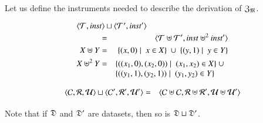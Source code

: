 \documentclass{elsarticle}
\begin{document}
   Let us define the instruments needed to describe the derivation of $\mathfrak{Z}_{\mathfrak{M}}$.
\begin{definition}
\begin{eqnarray}
   \omit\rlap{$\pair{\triples}{\inst}\sqcup\pair{\triples'}{\inst'}$}\notag\\
   &=&\pair{\triples\uplus\triples'}{\inst\uplus^2\inst'}\notag\\
      X\uplus Y&=&\{(x,0)\mid\ x\in X\}\ \cup\ \{(y,1)\mid\ y\in Y\}\\
      X\uplus^2 Y&=&\begin{array}[t]{@{}l}\{((x_1,0),(x_2,0))\mid\ (x_1,x_2)\in X\}\ \cup\\ \{((y_1,1),(y_2,1))\mid\ (y_1,y_2)\in Y\}\end{array}\\
\end{eqnarray}
\end{definition}

\begin{definition}
\begin{eqnarray}
   \langle{\mathcal{C}},{\mathcal{R}},{\mathcal{U}}\rangle\sqcup\langle{\mathcal{C}'},{\mathcal{R}'},{\mathcal{U}'}\rangle&=&\langle{\mathcal{C}\uplus\mathcal{C}},{\mathcal{R}\uplus\mathcal{R}'},{\mathcal{U}\uplus\mathcal{U}'}\rangle
\end{eqnarray}
\end{definition}
Note that if $\mathfrak{D}$ and $\mathfrak{D}'$ are datasets, then so is $\mathfrak{D}\sqcup\mathfrak{D}'$.
\end{document}
